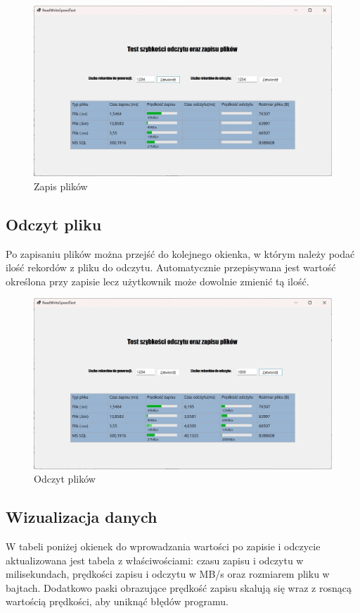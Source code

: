\documentclass{report}
\begin{document}
\begin{figure}[h]
\centering
\includegraphics[width=15cm]{img/zapis.jpg}
\caption{Zapis plików}
\end{figure}

\subsection{Odczyt pliku}
Po zapisaniu plików można przejść do kolejnego okienka, w którym należy podać ilość rekordów z pliku do odczytu. Automatycznie przepisywana jest wartość określona przy zapisie lecz użytkownik może dowolnie zmienić tą ilość.

\begin{figure}[h]
\centering
\includegraphics[width=15cm]{img/odczyt.jpg}
\caption{Odczyt plików}
\end{figure}

\subsection{Wizualizacja danych}
W tabeli poniżej okienek do wprowadzania wartości po zapisie i odczycie aktualizowana jest tabela z właściwościami: czasu zapisu i odczytu w milisekundach, prędkości zapisu i odczytu w MB/s oraz rozmiarem pliku w bajtach. Dodatkowo paski obrazujące prędkość zapisu skalują się wraz z rosnącą wartością prędkości, aby uniknąć błędów programu.
\end{document}
